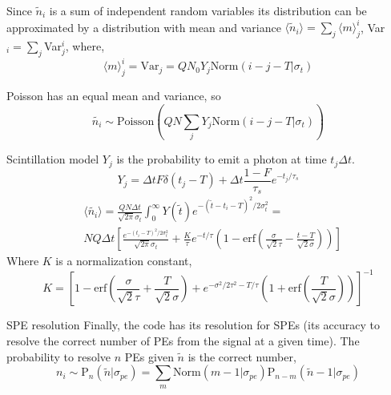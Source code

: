 \documentclass{beamer}
\begin{document}
\begin{frame}
Since $\tilde n_i$ is a sum of independent random variables its distribution can be approximated by a distribution with mean and variance $\langle\tilde{n}_i\rangle=\sum_j\langle m\rangle_j^i$, Var$_i=\sum_j$Var$_j^i$,
where, 
\begin{equation}
\langle m\rangle_j^i=\text{Var}_j=QN_0Y_j\text{Norm}(i-j-T|\sigma_t)
\end{equation}

Poisson has an equal mean and variance, so 
\begin{equation}
\tilde{n_i}\sim \text{Poisson}\left(QN\sum_jY_j\text{Norm}(i-j-T|\sigma_t)\right)
\end{equation}
\end{frame}

\begin{frame}{Scintillation model}
$Y_j$ is the probability to emit a photon at time $t_j\Delta t$.\\
\begin{equation}
Y_j=\Delta tF\delta(t_j-T)+\Delta t\frac{1-F}{\tau_s}e^{-t_j/\tau_s}
\end{equation}
\begin{equation}
\begin{split}
&\langle \tilde{n_i}\rangle=\frac{QN\Delta t}{\sqrt{2\pi}\sigma_t}\int_0^{\infty}Y(\tilde{t})e^{-(\tilde{t}-t_i-T)^2/2\sigma_t^2}=\\
&NQ\Delta t\left[\frac{e^{-(t_i-T)^2/2\sigma_t^2}}{\sqrt{2\pi}\sigma_t}+\frac{K}{\tau}e^{-t/\tau}\left(1-\text{erf}\left(\frac{\sigma}{\sqrt{2}\tau}-\frac{t-T}{\sqrt{2}\sigma}\right)\right)\right]
\end{split}
\end{equation}
Where $K$ is a normalization constant,
\begin{equation}
K=\left[1-\text{erf}\left(\frac{\sigma}{\sqrt{2}\tau}+\frac{T}{\sqrt{2}\sigma}\right)+e^{-\sigma^2/2\tau^2-T/\tau}\left(1+\text{erf}\left(\frac{T}{\sqrt{2}\sigma}\right)\right)\right]^{-1}
\end{equation}
\end{frame}

\begin{frame}{SPE resolution}
Finally, the code has its resolution for SPEs (its accuracy to resolve the correct number of PEs from the signal at a given time). The probability to resolve $n$ PEs given $\tilde{n}$ is the correct number,
\begin{equation}
n_i\sim \text{P}_{n}(\tilde n|\sigma_{pe})=\sum_{m}\text{Norm}(m-1|\sigma_{pe})\text{P}_{n-m}(\tilde{n}-1|\sigma_{pe})
\end{equation}
\end{frame}
\end{document}
